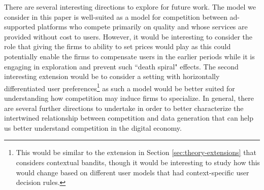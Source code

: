 \documentclass[../competing_bandits.tex]{subfiles}
\begin{document}
There are several interesting directions to explore for future work. The model we consider in this paper is well-suited as a model for competition between ad-supported platforms who compete primarily on quality and whose services are provided without cost to users. However, it would be interesting to consider the role that giving the firms to ability to set prices would play as this could potentially enable the firms to compensate users in the earlier periods while it is engaging in exploration and prevent such ``death spiral" effects. The second interesting extension would be to consider a setting with horizontally differentiated user preferences\footnote{This would be similar to the extension in Section \ref{sec:theory-extensions} that considers contextual bandits, though it would be interesting to study how this would change based on different user models that had context-specific user decision rules.} as such a model would be better suited for understanding how competition may induce firms to specialize. In general, there are several further directions to undertake in order to better characterize the intertwined relationship between competition and data generation that can help us better understand competition in the digital economy.
\end{document}
